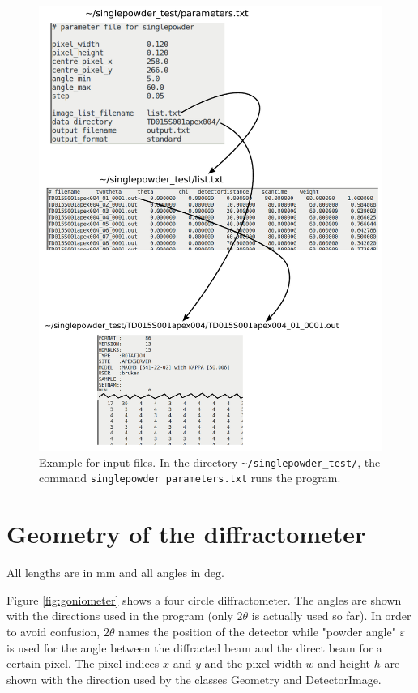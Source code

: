 \documentclass[a4paper, 12pt, twoside]{scrartcl}
\begin{document}
\begin{figure}
\includegraphics[width=15cm]{figs/files.pdf}
\caption{\label{fig:files}Example for input files. In the directory \texttt{\~{}/singlepowder\_test/}, the command \texttt{singlepowder parameters.txt} runs the program.}
\end{figure}

\section{Geometry of the diffractometer}

All lengths are in $ \mathrm{mm} $ and all angles in $ \mathrm{deg} $.

Figure \ref{fig:goniometer} shows a four circle diffractometer. The angles are shown with the directions used in the program (only $ 2\theta $ is actually used so far). In order to avoid confusion, $ 2\theta $ names the position of the detector while "powder angle" $ \varepsilon $ is used for the angle between the diffracted beam and the direct beam for a certain pixel. The pixel indices $ x $ and $ y $ and the pixel width $ w $ and height $ h $ are shown with the direction used by the classes Geometry and DetectorImage.
\end{document}
